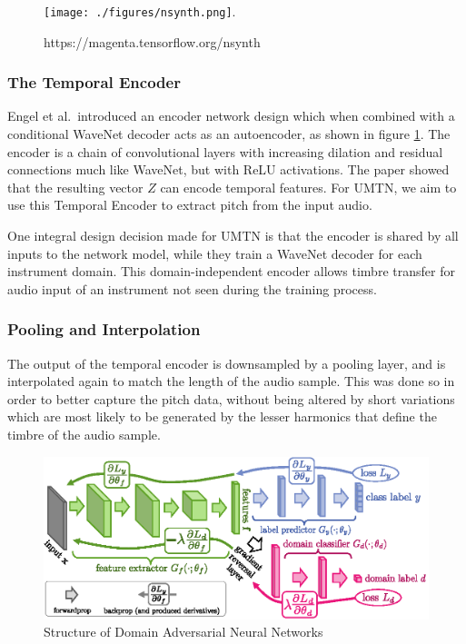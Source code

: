 \documentclass[12pt,a4paper,]{report}
\begin{document}
\begin{figure}[h]
    \texttt{[image: ./figures/nsynth.png]}.
    \centering
    \caption{https://magenta.tensorflow.org/nsynth \label{fig:nsynth}}
\end{figure}

\hypertarget{the-temporal-encoder}{%
\subsubsection{The Temporal Encoder}\label{the-temporal-encoder}}

Engel et al.~introduced an encoder network design which when combined
with a conditional WaveNet decoder acts as an autoencoder, as shown in
figure \ref{fig:nsynth}. The encoder is a chain of convolutional layers
with increasing dilation and residual connections much like WaveNet, but
with ReLU activations. The paper showed that the resulting vector \(Z\)
can encode temporal features. For UMTN, we aim to use this Temporal
Encoder to extract pitch from the input audio.

One integral design decision made for UMTN is that the encoder is shared
by all inputs to the network model, while they train a WaveNet decoder
for each instrument domain. This domain-independent encoder allows
timbre transfer for audio input of an instrument not seen during the
training process.

\hypertarget{pooling-and-interpolation}{%
\subsubsection{Pooling and
Interpolation}\label{pooling-and-interpolation}}

The output of the temporal encoder is downsampled by a pooling layer,
and is interpolated again to match the length of the audio sample. This
was done so in order to better capture the pitch data, without being
altered by short variations which are most likely to be generated by the
lesser harmonics that define the timbre of the audio sample.

\begin{figure}[h]
    \includegraphics[width=\textwidth]{figures/dann.eps}
    \centering
    \caption{Structure of Domain Adversarial Neural Networks \label{fig:dann}}
\end{figure}
\end{document}
